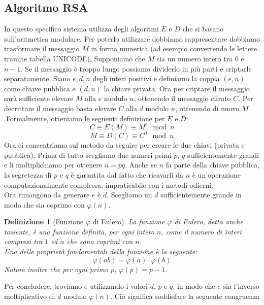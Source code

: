 \documentclass[italian,A4,12pt]{article}
\newtheorem*{defn}{Definizione}
\begin{document}
    \subsection{Algoritmo RSA}
      In questo specifico sistema utilizza degli algoritmi $E$ e $D$ che si basano sull'aritmetica modulare. Per poterlo utilizzare dobbiamo rappresentare dobbiamo trasformare il messaggio $M$ in forma numerica (ad esempio convertendo le lettere tramite tabella UNICODE). Supponiamo che $M$ sia un numero intero tra $0$ e $n-1$. Se il messaggio è troppo lungo possiamo dividerlo in più parti e criptarle separatamente. Siano $e,d,n$ degli interi positivi e definiamo la coppia $(e,n)$ come chiave pubblica e $(d,n)$ la chiave privata.
      Ora per criptare il messaggio sarà sufficiente elevare $M$ alla $e$ modulo $n$, ottenendo il messaggio cifrato $C$. Per decrittare il messaggio basta elevare $C$ alla $d$ modulo $n$, ottenendo di nuovo $M$.Formalmente, otteniamo le seguenti definizione per $E$ e $D$:
      \begin{equation}
        C\equiv E(M) \equiv M^e \mod{n}
     \end{equation}
      $$M \equiv D(C) \equiv C^d \mod{n}$$
      Ora ci concentriamo sul metodo da seguire per creare le due chiavi (privata e pubblica). Prima di tutto scegliamo due numeri primi $p$, $q$ sufficientemente grandi e li moltiplichiamo per ottenere $n=pq$. Anche se $n$ fa parte della chiave pubblica, la segretezza di $p$ e $q$ è garantita dal fatto che ricavarli da $n$ è un'operazione computazionalmente complessa, impraticabile con i metodi odierni.\\
      Ora rimangono da generare $e$ è $d$. Scegliamo un $d$ sufficientemente grande in modo che sia coprimo con $\varphi(n)$.
      \begin{defn}[Funzione $\varphi$ di Eulero]
        La funzione $\varphi$ di Eulero, detta anche toziente, è una funzione definita, per ogni intero $n$, come il numero di interi compresi tra $1$ ed $n$ che sono coprimi con $n$.\\ Una delle proprietà fondamentali della funzione è la seguente:
        \begin{equation}
          \varphi(ab)=\varphi(a)\cdot \varphi(b) \label{phii}
        \end{equation}
        Notare inoltre che per ogni primo $p$, $\varphi(p)=p-1$.
      \end{defn}
      Per concludere, troviamo $e$ utilizzando i valori $d$, $p$ e $q$, in modo che $e$ sia l'inverso moltiplicativo di $d$ modulo $\varphi(n)$. Ciò significa soddisfare la seguente congruenza
\end{document}
